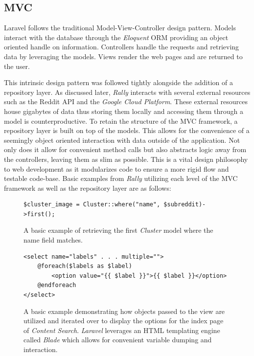 \documentclass[msc,oneside]{ubcthesis}%
\begin{document}
\subsection{MVC}
Laravel follows the traditional Model-View-Controller design pattern. Models interact with the database through the \textit{Eloquent} ORM providing an object oriented handle on information. Controllers handle the requests and retrieving data by leveraging the models. Views render the web pages and are returned to the user.
\par
This intrinsic design pattern was followed tightly alongside the addition of a repository layer. As discussed later, \textit{Rally} interacts with several external resources such as the Reddit API and the \textit{Google Cloud Platform}. These external resources house gigabytes of data thus storing them locally and accessing them through a model is counterproductive. To retain the structure of the MVC framework, a repository layer is built on top of the models. This allows for the convenience of a seemingly object oriented interaction with data outside of the application. Not only does it allow for convenient method calls but also abstracts logic away from the controllers, leaving them as slim as possible. This is a vital design philosophy to web development as it modularizes code to ensure a more rigid flow and testable code-base. Basic examples from \textit{Rally} utilizing each level of the MVC framework as well as the repository layer are as follows:
\par{}
\begin{figure}[H]
\begin{center}
\begin{lstlisting}
$cluster_image = Cluster::where("name", $subreddit)->first();
\end{lstlisting}
\end{center}
\caption[Example of Model]{
A basic example of retrieving the first \textit{Cluster} model where the name field matches.}
\end{figure}

\begin{figure}[H]
\begin{lstlisting}
<select name="labels" . . . multiple="">
	@foreach($labels as $label)
		<option value="{{ $label }}">{{ $label }}</option>
	@endforeach
</select>
\end{lstlisting}
\caption[Example of View]{
A basic example demonstrating how objects passed to the view are utilized and iterated over to display the options for the index page of \textit{Content Search}. \textit{Laravel} leverages an HTML templating engine called \textit{Blade} which allows for convenient variable dumping and interaction.}
\end{figure}
\end{document}
